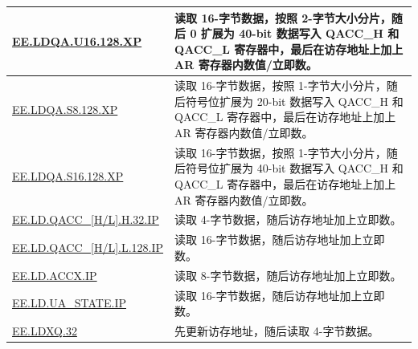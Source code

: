 \begin{longtable}[c]{|l|m{12cm}|}
    \\\hline
    \hyperref[instruction:EELDQAU16128XP]{EE.LDQA.U16.128.XP} & 读取 16-字节数据，按照 2-字节大小分片，随后 0 扩展为 40-bit 数据写入 QACC\_H 和 QACC\_L 寄存器中，最后在访存地址上加上 AR 寄存器内数值/立即数。
    \\\hline
    \hyperref[instruction:EELDQAS8128XP]{EE.LDQA.S8.128.XP} & 读取 16-字节数据，按照 1-字节大小分片，随后符号位扩展为 20-bit 数据写入 QACC\_H 和 QACC\_L 寄存器中，最后在访存地址上加上 AR 寄存器内数值/立即数。
    \\\hline
    \hyperref[instruction:EELDQAS16128XP]{EE.LDQA.S16.128.XP} & 读取 16-字节数据，按照 1-字节大小分片，随后符号位扩展为 40-bit 数据写入 QACC\_H 和 QACC\_L 寄存器中，最后在访存地址上加上 AR 寄存器内数值/立即数。
    \\\hline
    \hyperref[instruction:EELDQACCHH32IP]{EE.LD.QACC\_[H/L].H.32.IP} & 读取 4-字节数据，随后访存地址加上立即数。
    \\\hline
    \hyperref[instruction:EELDQACCHL128IP]{EE.LD.QACC\_[H/L].L.128.IP} & 读取 16-字节数据，随后访存地址加上立即数。
    \\\hline
    \hyperref[instruction:EELDACCXIP]{EE.LD.ACCX.IP} & 读取 8-字节数据，随后访存地址加上立即数。
    \\\hline
    \hyperref[instruction:EELDUASTATEIP]{EE.LD.UA\_STATE.IP} & 读取 16-字节数据，随后访存地址加上立即数。
    \\\hline
    \hyperref[instruction:EELDXQ32]{EE.LDXQ.32} & 先更新访存地址，随后读取 4-字节数据。
    \\\hline
\end{longtable}